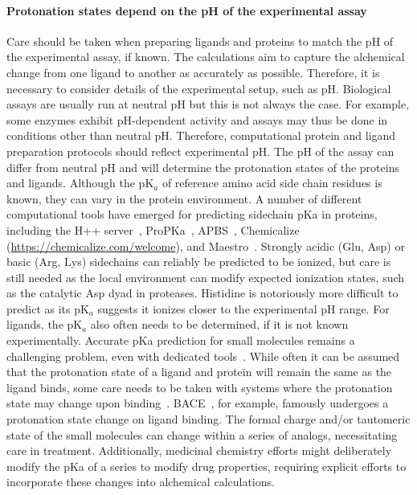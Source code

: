 \documentclass[9pt,bestpractices]{livecoms}
\begin{document}
\paragraph{Protonation states depend on the pH of the experimental assay}
Care should be taken when preparing ligands and proteins to match the pH of the experimental assay, if known.  The calculations aim to capture the alchemical change from one ligand to another as accurately as possible. Therefore, it is necessary to consider details of the experimental setup, such as pH. Biological assays are usually run at neutral pH but this is not always the case. For example, some enzymes exhibit pH-dependent activity and assays may thus be done in conditions other than neutral pH. Therefore, computational protein and ligand preparation protocols should reflect experimental pH. The pH of the assay can differ from neutral pH and will determine the protonation states of the proteins and ligands. Although the pK$_a$ of reference amino acid side chain residues is known, they can vary in the protein environment. A number of different computational tools have emerged for predicting sidechain pKa in proteins, including the H++ server~\cite{anandakrishnan2012automating}, ProPKa~\cite{olsson2011propka3,sondergaard2011improved}, APBS~\cite{jurrus2018improvement}, Chemicalize (\url{https://chemicalize.com/welcome}), and Maestro~\cite{maestro2020maestro}. Strongly acidic (Glu, Asp) or basic (Arg, Lys) sidechains can reliably be predicted to be ionized, but care is still needed as the local environment can modify expected ionization states, such as  the catalytic Asp dyad in proteases. Histidine is notoriously more difficult to predict as its pK$_a$ suggests it ionizes closer to the experimental pH range. For ligands, the pK$_a$ also often needs to be determined, if it is not known experimentally. Accurate pKa prediction for small molecules remains a challenging problem, even with dedicated tools~\cite{isik2018pka}. While often it can be assumed that the protonation state of a ligand and protein will remain the same as the ligand binds, some care needs to be taken with systems where the protonation state may change upon binding~\cite{onufriev2013protonation}. BACE~\cite{kim2015conformational}, for example, famously undergoes a protonation state change on ligand binding. The formal charge and/or tautomeric state of the small molecules can change within a series of analogs, necessitating care in treatment. Additionally, medicinal chemistry efforts might deliberately modify the pKa of a series to modify drug properties, requiring explicit efforts to incorporate these changes into alchemical calculations.
\end{document}
